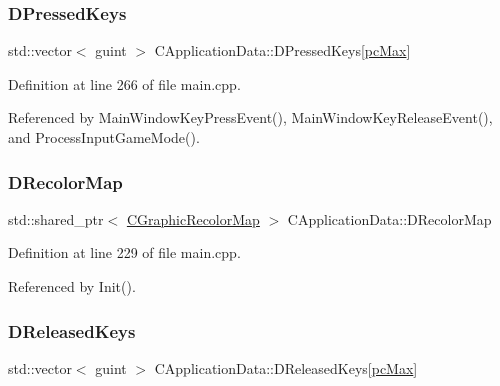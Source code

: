 \hypertarget{classCApplicationData_ac6f50c764f7561c0bd2a9fbce55b2701}{}\label{classCApplicationData_ac6f50c764f7561c0bd2a9fbce55b2701} 
\subsubsection{\texorpdfstring{D\+Pressed\+Keys}{DPressedKeys}}
{\footnotesize\ttfamily std\+::vector$<$ guint $>$ C\+Application\+Data\+::\+D\+Pressed\+Keys\mbox{[}\hyperlink{GameDataTypes_8h_aafb0ca75933357ff28a6d7efbdd7602fa594a5c8dd3987f24e8a0f23f1a72cd34}{pc\+Max}\mbox{]}\hspace{0.3cm}{\ttfamily [protected]}}



Definition at line 266 of file main.\+cpp.



Referenced by Main\+Window\+Key\+Press\+Event(), Main\+Window\+Key\+Release\+Event(), and Process\+Input\+Game\+Mode().

\hypertarget{classCApplicationData_afcbfb5d837afd5c117d91216d1988a53}{}\label{classCApplicationData_afcbfb5d837afd5c117d91216d1988a53} 
\subsubsection{\texorpdfstring{D\+Recolor\+Map}{DRecolorMap}}
{\footnotesize\ttfamily std\+::shared\+\_\+ptr$<$ \hyperlink{classCGraphicRecolorMap}{C\+Graphic\+Recolor\+Map} $>$ C\+Application\+Data\+::\+D\+Recolor\+Map\hspace{0.3cm}{\ttfamily [protected]}}



Definition at line 229 of file main.\+cpp.



Referenced by Init().

\hypertarget{classCApplicationData_adcef59167cadd8ee516884a7c0df08f6}{}\label{classCApplicationData_adcef59167cadd8ee516884a7c0df08f6} 
\subsubsection{\texorpdfstring{D\+Released\+Keys}{DReleasedKeys}}
{\footnotesize\ttfamily std\+::vector$<$ guint $>$ C\+Application\+Data\+::\+D\+Released\+Keys\mbox{[}\hyperlink{GameDataTypes_8h_aafb0ca75933357ff28a6d7efbdd7602fa594a5c8dd3987f24e8a0f23f1a72cd34}{pc\+Max}\mbox{]}\hspace{0.3cm}{\ttfamily [protected]}}



